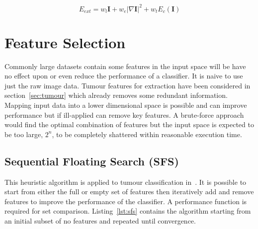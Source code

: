 \documentclass[journal]{IEEEtran}
\begin{document}
\begin{equation}
	 E_{ext}= w_{l}\mathbf{I} + w_{e}|\nabla \mathbf{I}|^2 + w_{t}E_c(\mathbf{I})
	 \label{eqn:contour_int}
\end{equation}















\section{Feature Selection}
\label{sec:selection}

Commonly large datasets contain some features in the input space will be have no effect upon or even reduce the performance of a classifier.
It is naive to use just the raw image data.
Tumour features for extraction have been considered in section~\ref{sec:tumour} which already removes some redundant information. 
Mapping input data into a lower dimensional space is possible and can improve performance but if ill-applied can remove key features.
A brute-force approach would find the optimal combination of features but the input space is expected to be too large, $2^n$, to be completely shattered within reasonable execution time. 



\subsection{Sequential Floating Search (SFS)}

This heuristic algorithm is applied to tumour classification in~\cite{hau07feat}.
It is possible to start from either the full or empty set of features then iteratively add and remove features to improve the performance of the classifier. 
A performance function is required for set comparison. 
Listing~\ref{lst:sfs} contains the algorithm starting from an initial subset of no features and repeated until convergence.


\end{document}
